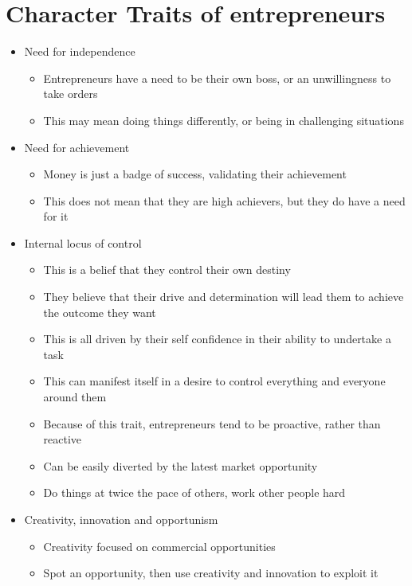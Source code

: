 \documentclass{article}[18pt]
\begin{document}
\section{Character Traits of entrepreneurs}
\begin{itemize}
\item Need for independence
\begin{itemize}
\item Entrepreneurs have a need to be their own boss, or an unwillingness to take orders
\item This may mean doing things differently, or being in challenging situations
\end{itemize}

\item Need for achievement
\begin{itemize}
\item Money is just a badge of success, validating their achievement
\item This does not mean that they are high achievers, but they do have a need for it
\end{itemize}

\item Internal locus of control
\begin{itemize}
\item This is a belief that they control their own destiny
\item They believe that their drive and determination will lead them to achieve the outcome they want
\item This is all driven by their self confidence in their ability to undertake a task
\item This can manifest itself in a desire to control everything and everyone around them
\item Because of this trait, entrepreneurs tend to be proactive, rather than reactive
\item Can be easily diverted by the latest market opportunity
\item Do things at twice the pace of others, work other people hard
\end{itemize}

\item Creativity, innovation and opportunism
\begin{itemize}
\item Creativity focused on commercial opportunities 
\item Spot an opportunity, then use creativity and innovation to exploit it
\end{itemize}


\end{itemize}
\end{document}
